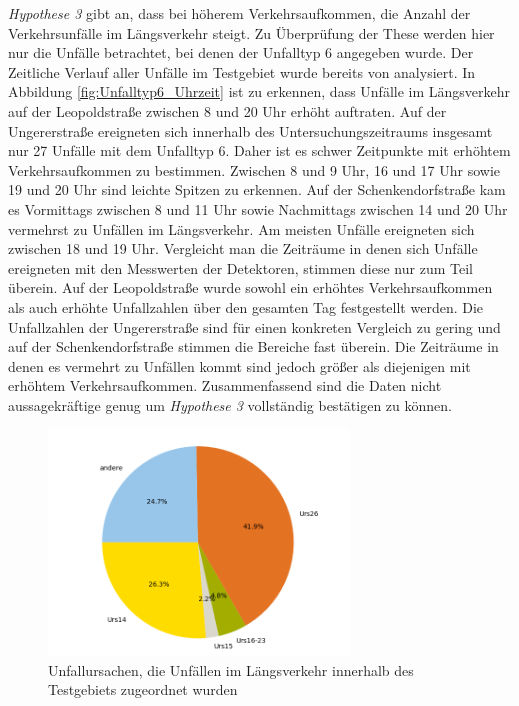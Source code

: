 \textit{Hypothese 3} gibt an, dass bei höherem Verkehrsaufkommen, die Anzahl der Verkehrsunfälle im Längsverkehr steigt. Zu Überprüfung der These werden hier nur die Unfälle betrachtet, bei denen der Unfalltyp 6 angegeben wurde. Der Zeitliche Verlauf aller Unfälle im Testgebiet wurde bereits von \Textcite[S.10-16]{Bruhn.2018} analysiert. In Abbildung \ref{fig:Unfalltyp6_Uhrzeit} ist zu erkennen, dass Unfälle im Längsverkehr auf der Leopoldstraße zwischen 8 und 20 Uhr erhöht auftraten. Auf der Ungererstraße ereigneten sich innerhalb des Untersuchungszeitraums insgesamt nur 27 Unfälle mit dem Unfalltyp 6. Daher ist es schwer Zeitpunkte mit erhöhtem Verkehrsaufkommen zu bestimmen. Zwischen 8 und 9 Uhr, 16 und 17 Uhr sowie 19 und 20 Uhr sind leichte Spitzen zu erkennen. Auf der Schenkendorfstraße kam es Vormittags zwischen 8 und 11 Uhr sowie Nachmittags zwischen 14 und 20 Uhr vermehrst zu Unfällen im Längsverkehr. Am meisten Unfälle ereigneten sich zwischen 18 und 19 Uhr. Vergleicht man die Zeiträume in denen sich Unfälle ereigneten mit den Messwerten der Detektoren, stimmen diese nur zum Teil überein. Auf der Leopoldstraße wurde sowohl ein erhöhtes Verkehrsaufkommen als auch erhöhte Unfallzahlen über den gesamten Tag festgestellt werden. Die Unfallzahlen der Ungererstraße sind für einen konkreten Vergleich zu gering und auf der Schenkendorfstraße stimmen die Bereiche fast überein. Die Zeiträume in denen es vermehrt zu Unfällen kommt sind jedoch größer als diejenigen mit erhöhtem Verkehrsaufkommen. Zusammenfassend sind die Daten nicht aussagekräftige genug um \textit{Hypothese 3} vollständig bestätigen zu können.

\begin{savenotes}
	\begin{figure}[H]
		\centering
		\includegraphics[width=8cm,height=6cm]{figures/Urs_Typ6}
		\caption[Unfallursachen, die Unfällen im Längsverkehr innerhalb des Testgebiets zugeordnet wurden]{Unfallursachen, die Unfällen im Längsverkehr innerhalb des Testgebiets zugeordnet wurden}\label{fig:Unfallursachen_Unfalltyp6}
	\end{figure}
\end{savenotes}

